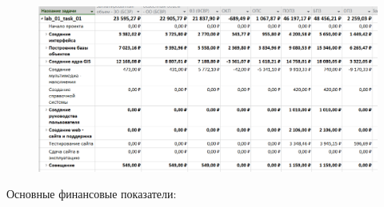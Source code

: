 \begin{figure}[h!]
	\begin{center}
		\includegraphics[scale=0.5]{inc/img/p_3.png}
	\end{center}
	\captionsetup{justification=centering}
	\label{fig:u3}
\end{figure}

Основные финансовые показатели:


